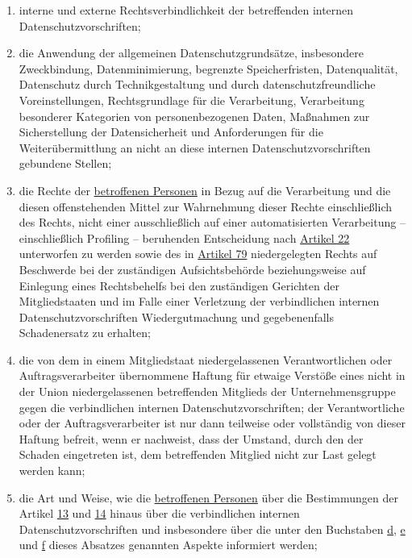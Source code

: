 \begin{enumerate}
\begin{enumerate}
    \item interne und externe Rechtsverbindlichkeit der betreffenden internen Datenschutzvorschriften;
    \label{itm:47-2c}

    \item die Anwendung der allgemeinen Datenschutzgrundsätze, insbesondere Zweckbindung, Datenminimierung, begrenzte
     Speicherfristen, Datenqualität, Datenschutz durch Technikgestaltung und durch datenschutzfreundliche
     Voreinstellungen, Rechtsgrundlage für die Verarbeitung, Verarbeitung besonderer Kategorien von personenbezogenen
     Daten, Maßnahmen zur Sicherstellung der Datensicherheit und Anforderungen für die Weiterübermittlung an nicht an
     diese internen Datenschutzvorschriften gebundene Stellen;
    \label{itm:47-2d}

    \item die Rechte der \hyperref[itm:04-1]{betroffenen Personen} in Bezug auf die Verarbeitung und die diesen offenstehenden Mittel zur
     Wahrnehmung dieser Rechte einschließlich des Rechts, nicht einer ausschließlich auf einer automatisierten
     Verarbeitung -- einschließlich Profiling -- beruhenden Entscheidung nach \hyperref[ch:22]{Artikel 22} unterworfen
     zu werden sowie des in \hyperref[ch:79]{Artikel 79} niedergelegten Rechts auf Beschwerde bei der zuständigen
     Aufsichtsbehörde beziehungsweise auf Einlegung eines Rechtsbehelfs bei den zuständigen Gerichten der
     Mitgliedstaaten und im Falle einer Verletzung der verbindlichen internen Datenschutzvorschriften Wiedergutmachung
     und gegebenenfalls Schadenersatz zu erhalten;
    \label{itm:47-2e}

    \item die von dem in einem Mitgliedstaat niedergelassenen Verantwortlichen oder Auftragsverarbeiter übernommene
     Haftung für etwaige Verstöße eines nicht in der Union niedergelassenen betreffenden Mitglieds der
     Unternehmensgruppe gegen die verbindlichen internen Datenschutzvorschriften; der Verantwortliche oder der
     Auftragsverarbeiter ist nur dann teilweise oder vollständig von dieser Haftung befreit, wenn er nachweist, dass
     der Umstand, durch den der Schaden eingetreten ist, dem betreffenden Mitglied nicht zur Last gelegt werden kann;
    \label{itm:47-2f}

    \item die Art und Weise, wie die \hyperref[itm:04-1]{betroffenen Personen} über die Bestimmungen der Artikel \hyperref[ch:13]{13} und
     \hyperref[ch:14]{14} hinaus über die verbindlichen internen Datenschutzvorschriften und insbesondere über die unter
     den Buchstaben \hyperref[itm:47-2d]{d}, \hyperref[itm:47-2e]{e} und \hyperref[itm:47-2f]{f} dieses Absatzes
     genannten Aspekte informiert werden;
    \label{itm:47-2g}


\end{enumerate}
\end{enumerate}
